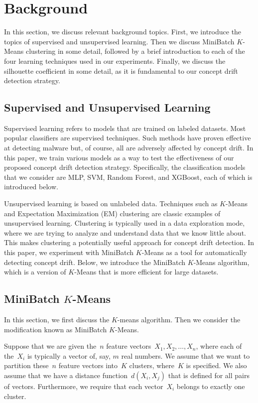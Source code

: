 \documentclass[12pt]{article}
\begin{document}
\section{Background}\label{chap:bg}

In this section, we discuss relevant background topics. First, we
introduce the topics of supervised and unsupervised learning. Then we 
discuss MiniBatch $K$-Means clustering in some detail, followed by
a brief introduction to each of the four learning techniques used in our experiments.
Finally, we discuss the silhouette coefficient in some detail, as it is 
fundamental to our concept drift detection strategy.

\subsection{Supervised and Unsupervised Learning}

Supervised learning refers to models that are trained on labeled datasets. 
Most popular classifiers are supervised techniques. 
Such methods have proven effective at detecting malware but, 
of course, all are adversely affected by concept drift. 
In this paper, we train various models as a way to test the effectiveness
of our proposed concept drift detection strategy. Specifically, the 
classification models that we consider
are MLP, SVM, Random Forest, and XGBoost, 
each of which is introduced below.

Unsupervised learning is based on unlabeled data. Techniques such as $K$-Means
and Expectation Maximization (EM) clustering are classic 
examples of unsupervised learning. Clustering is typically used
in a data exploration mode, where we are trying to analyze and understand data that
we know little about. This makes clustering a potentially useful approach 
for concept drift detection. In this paper, we experiment with MiniBatch $K$-Means 
as a tool for automatically detecting concept drift. Below, we introduce the 
MiniBatch $K$-Means algorithm, which is a version of $K$-Means that is more efficient
for large datasets.

\subsection{MiniBatch $K$-Means}

In this section, we first discuss the $K$-means algorithm. Then 
we consider the modification known as MiniBatch $K$-Means.

Suppose that we are given the~$n$ feature vectors~$X_1, X_2, \ldots, X_n$,
where each of the~$X_i$ is typically a vector of, say, $m$ real numbers. 
We assume that we want to partition these~$n$ feature vectors
into~$K$ clusters, where~$K$ is specified. 
We also assume that we have a distance function~$d(X_i,X_j)$
that is defined for all pairs of vectors.
Furthermore, we require that each vector~$X_i$ belongs to exactly one cluster.
\end{document}
